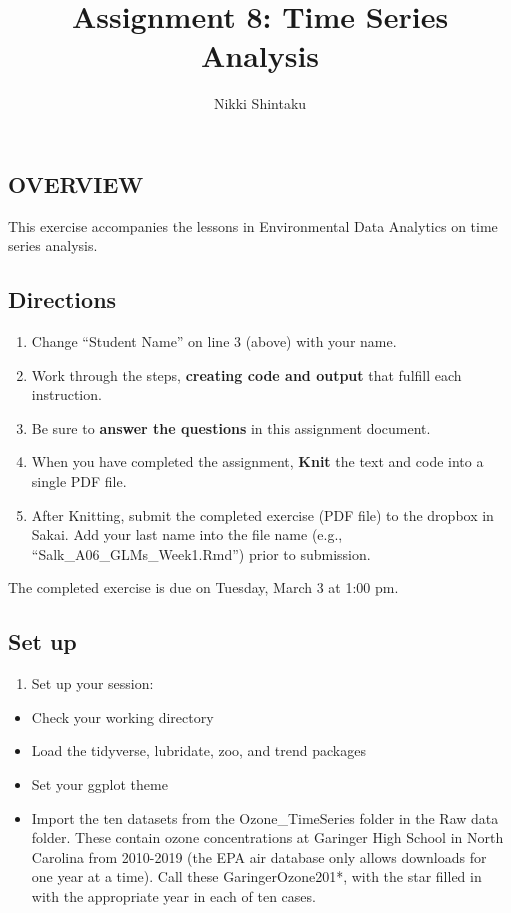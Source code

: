\documentclass[]{article}
\title{Assignment 8: Time Series Analysis}
\author{Nikki Shintaku}
\date{}
\providecommand{\tightlist}{%
  \setlength{\itemsep}{0pt}\setlength{\parskip}{0pt}}
\begin{document}
\maketitle

\hypertarget{overview}{%
\subsection{OVERVIEW}\label{overview}}

This exercise accompanies the lessons in Environmental Data Analytics on
time series analysis.

\hypertarget{directions}{%
\subsection{Directions}\label{directions}}

\begin{enumerate}
\def\labelenumi{\arabic{enumi}.}
\tightlist
\item
  Change ``Student Name'' on line 3 (above) with your name.
\item
  Work through the steps, \textbf{creating code and output} that fulfill
  each instruction.
\item
  Be sure to \textbf{answer the questions} in this assignment document.
\item
  When you have completed the assignment, \textbf{Knit} the text and
  code into a single PDF file.
\item
  After Knitting, submit the completed exercise (PDF file) to the
  dropbox in Sakai. Add your last name into the file name (e.g.,
  ``Salk\_A06\_GLMs\_Week1.Rmd'') prior to submission.
\end{enumerate}

The completed exercise is due on Tuesday, March 3 at 1:00 pm.

\hypertarget{set-up}{%
\subsection{Set up}\label{set-up}}

\begin{enumerate}
\def\labelenumi{\arabic{enumi}.}
\tightlist
\item
  Set up your session:
\end{enumerate}

\begin{itemize}
\tightlist
\item
  Check your working directory
\item
  Load the tidyverse, lubridate, zoo, and trend packages
\item
  Set your ggplot theme
\item
  Import the ten datasets from the Ozone\_TimeSeries folder in the Raw
  data folder. These contain ozone concentrations at Garinger High
  School in North Carolina from 2010-2019 (the EPA air database only
  allows downloads for one year at a time). Call these
  GaringerOzone201*, with the star filled in with the appropriate year
  in each of ten cases.
\end{itemize}
\end{document}
